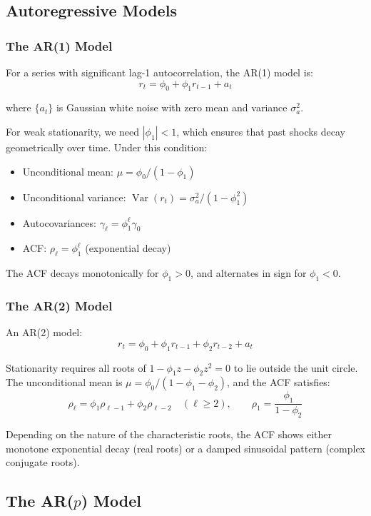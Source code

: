\subsection{Autoregressive Models}
\subsubsection{The AR(1) Model}

For a series with significant lag-1 autocorrelation, the AR(1) model is:
$$r_t = \phi_0 + \phi_1 r_{t-1} + a_t$$

where $\{a_t\}$ is Gaussian white noise with zero mean and variance $\sigma_a^2$.

For weak stationarity, we need $|\phi_1| < 1$, which ensures that past shocks decay geometrically over time. Under this condition:
\begin{itemize}
    \item Unconditional mean: $\mu = \phi_0/(1 - \phi_1)$
    \item Unconditional variance: $\operatorname{Var}(r_t) = \sigma_a^2/(1 - \phi_1^2)$
    \item Autocovariances: $\gamma_\ell = \phi_1^\ell \gamma_0$
    \item ACF: $\rho_\ell = \phi_1^\ell$ (exponential decay)
\end{itemize}

The ACF decays monotonically for $\phi_1 > 0$, and alternates in sign for $\phi_1 < 0$.
\subsubsection{The AR(2) Model}

An AR(2) model:
$$r_t = \phi_0 + \phi_1 r_{t-1} + \phi_2 r_{t-2} + a_t$$

Stationarity requires all roots of $1 - \phi_1 z - \phi_2 z^2 = 0$ to lie outside the unit circle. The unconditional mean is $\mu = \phi_0/(1 - \phi_1 - \phi_2)$, and the ACF satisfies:
$$\rho_\ell = \phi_1 \rho_{\ell-1} + \phi_2 \rho_{\ell-2} \quad (\ell \geq 2), \qquad \rho_1 = \frac{\phi_1}{1-\phi_2}$$

Depending on the nature of the characteristic roots, the ACF shows either monotone exponential decay (real roots) or a damped sinusoidal pattern (complex conjugate roots).

\subsection[The AR(p) Model]{The AR(\texorpdfstring{$p$}{p}) Model}

